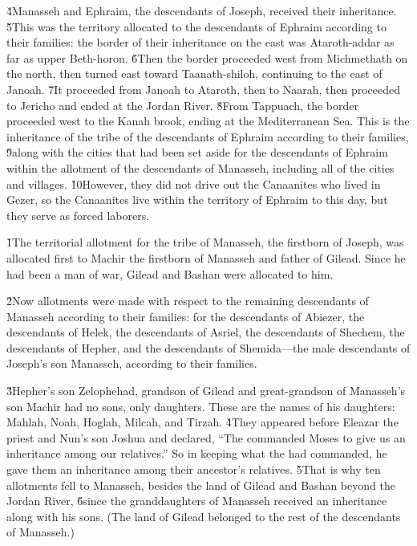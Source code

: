 \v{4}Manasseh and Ephraim, the descendants of Joseph, received their inheritance. \v{5}This was the territory allocated to the descendants of Ephraim according to their families: the border of their inheritance on the east was Ataroth-addar as far as upper Beth-horon. \v{6}Then the border proceeded west from Michmethath on the north, then turned east toward Taanath-shiloh, continuing to the east of Janoah. \v{7}It proceeded from Janoah to Ataroth, then to Naarah, then proceeded to Jericho and ended at the Jordan River. \v{8}From Tappuach, the border proceeded west to the Kanah brook, ending at the Mediterranean Sea. This is the inheritance of the tribe of the descendants of Ephraim according to their families, \v{9}along with the cities that had been set aside for the descendants of Ephraim within the allotment of the descendants of Manasseh, including all of the cities and villages. \v{10}However, they did not drive out the Canaanites who lived in Gezer, so the Canaanites live within the territory of Ephraim to this day, but they serve as forced laborers.

\v{1}The territorial allotment for the tribe of Manasseh, the firstborn of Joseph, was allocated first to Machir the firstborn of Manasseh and father of Gilead. Since he had been a man of war, Gilead and Bashan were allocated to him.

\v{2}Now allotments were made with respect to the remaining descendants of Manasseh according to their families: for the descendants of Abiezer, the descendants of Helek, the descendants of Asriel, the descendants of Shechem, the descendants of Hepher, and the descendants of Shemida---the male descendants of Joseph's son Manasseh, according to their families.

\v{3}Hepher's son Zelophehad, grandson of Gilead and great-grandson of Manasseh's son Machir had no sons, only daughters. These are the names of his daughters: Mahlah, Noah, Hoglah, Milcah, and Tirzah. \v{4}They appeared before Eleazar the priest and Nun's son Joshua and declared, ``The  commanded Moses to give us an inheritance among our relatives.'' So in keeping what the  had commanded, he gave them an inheritance among their ancestor's relatives. \v{5}That is why ten allotments fell to Manasseh, besides the land of Gilead and Bashan beyond the Jordan River, \v{6}since the granddaughters of Manasseh received an inheritance along with his sons. (The land of Gilead belonged to the rest of the descendants of Manasseh.)

